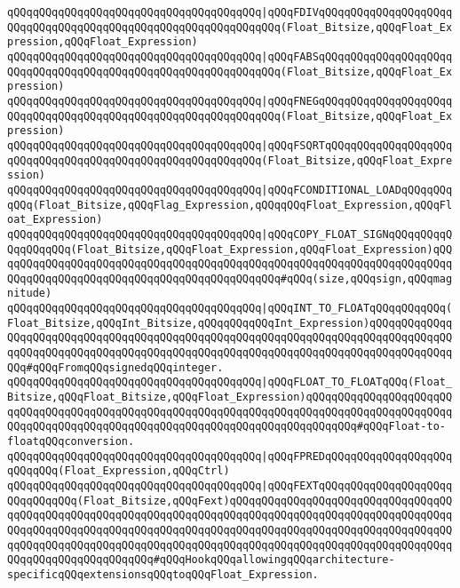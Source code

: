 \verb|qQQqqQQqqQQqqQQqqQQqqQQqqQQqqQQqqQQqqQQq|\verb#|qQQqFDIVqQQqqQQqqQQqqQQqqQQqqQQqqQQqqQQqqQQqqQQqqQQqqQQqqQQqqQQqqQQqqQQq(Float_Bitsize,qQQqFloat_Expression,qQQqFloat_Expression)#\newline
\verb|qQQqqQQqqQQqqQQqqQQqqQQqqQQqqQQqqQQqqQQq|\verb#|qQQqFABSqQQqqQQqqQQqqQQqqQQqqQQqqQQqqQQqqQQqqQQqqQQqqQQqqQQqqQQqqQQqqQQq(Float_Bitsize,qQQqFloat_Expression)#\newline
\verb|qQQqqQQqqQQqqQQqqQQqqQQqqQQqqQQqqQQqqQQq|\verb#|qQQqFNEGqQQqqQQqqQQqqQQqqQQqqQQqqQQqqQQqqQQqqQQqqQQqqQQqqQQqqQQqqQQqqQQq(Float_Bitsize,qQQqFloat_Expression)#\newline
\verb|qQQqqQQqqQQqqQQqqQQqqQQqqQQqqQQqqQQqqQQq|\verb#|qQQqFSQRTqQQqqQQqqQQqqQQqqQQqqQQqqQQqqQQqqQQqqQQqqQQqqQQqqQQqqQQqqQQq(Float_Bitsize,qQQqFloat_Expression)#\newline
\verb|qQQqqQQqqQQqqQQqqQQqqQQqqQQqqQQqqQQqqQQq|\verb#|qQQqFCONDITIONAL_LOADqQQqqQQqqQQq(Float_Bitsize,qQQqFlag_Expression,qQQqqQQqFloat_Expression,qQQqFloat_Expression)#\newline
\verb|qQQqqQQqqQQqqQQqqQQqqQQqqQQqqQQqqQQqqQQq|\verb#|qQQqCOPY_FLOAT_SIGNqQQqqQQqqQQqqQQqqQQq(Float_Bitsize,qQQqFloat_Expression,qQQqFloat_Expression)qQQqqQQqqQQqqQQqqQQqqQQqqQQqqQQqqQQqqQQqqQQqqQQqqQQqqQQqqQQqqQQqqQQqqQQqqQQqqQQqqQQqqQQqqQQqqQQqqQQqqQQqqQQqqQQqqQQq#\verb|#qQQq(size,qQQqsign,qQQqmagnitude)|\newline
\newline
\verb|qQQqqQQqqQQqqQQqqQQqqQQqqQQqqQQqqQQqqQQq|\verb#|qQQqINT_TO_FLOATqQQqqQQqqQQq(Float_Bitsize,qQQqInt_Bitsize,qQQqqQQqqQQqInt_Expression)qQQqqQQqqQQqqQQqqQQqqQQqqQQqqQQqqQQqqQQqqQQqqQQqqQQqqQQqqQQqqQQqqQQqqQQqqQQqqQQqqQQqqQQqqQQqqQQqqQQqqQQqqQQqqQQqqQQqqQQqqQQqqQQqqQQqqQQqqQQqqQQqqQQqqQQqqQQq#\verb|#qQQqFromqQQqsignedqQQqinteger.|\newline
\verb|qQQqqQQqqQQqqQQqqQQqqQQqqQQqqQQqqQQqqQQq|\verb#|qQQqFLOAT_TO_FLOATqQQq(Float_Bitsize,qQQqFloat_Bitsize,qQQqFloat_Expression)qQQqqQQqqQQqqQQqqQQqqQQqqQQqqQQqqQQqqQQqqQQqqQQqqQQqqQQqqQQqqQQqqQQqqQQqqQQqqQQqqQQqqQQqqQQqqQQqqQQqqQQqqQQqqQQqqQQqqQQqqQQqqQQqqQQqqQQqqQQqqQQqqQQq#\verb|#qQQqFloat-to-floatqQQqconversion.|\newline
\newline
\verb|qQQqqQQqqQQqqQQqqQQqqQQqqQQqqQQqqQQqqQQq|\verb#|qQQqFPREDqQQqqQQqqQQqqQQqqQQqqQQqqQQq(Float_Expression,qQQqCtrl)#\newline
\newline
\verb|qQQqqQQqqQQqqQQqqQQqqQQqqQQqqQQqqQQqqQQq|\verb#|qQQqFEXTqQQqqQQqqQQqqQQqqQQqqQQqqQQqqQQq(Float_Bitsize,qQQqFext)qQQqqQQqqQQqqQQqqQQqqQQqqQQqqQQqqQQqqQQqqQQqqQQqqQQqqQQqqQQqqQQqqQQqqQQqqQQqqQQqqQQqqQQqqQQqqQQqqQQqqQQqqQQqqQQqqQQqqQQqqQQqqQQqqQQqqQQqqQQqqQQqqQQqqQQqqQQqqQQqqQQqqQQqqQQqqQQqqQQqqQQqqQQqqQQqqQQqqQQqqQQqqQQqqQQqqQQqqQQqqQQqqQQqqQQqqQQqqQQqqQQqqQQqqQQqqQQqqQQqqQQqqQQq#\verb|#qQQqHookqQQqallowingqQQqarchitecture-specificqQQqextensionsqQQqtoqQQqFloat_Expression.|\newline
